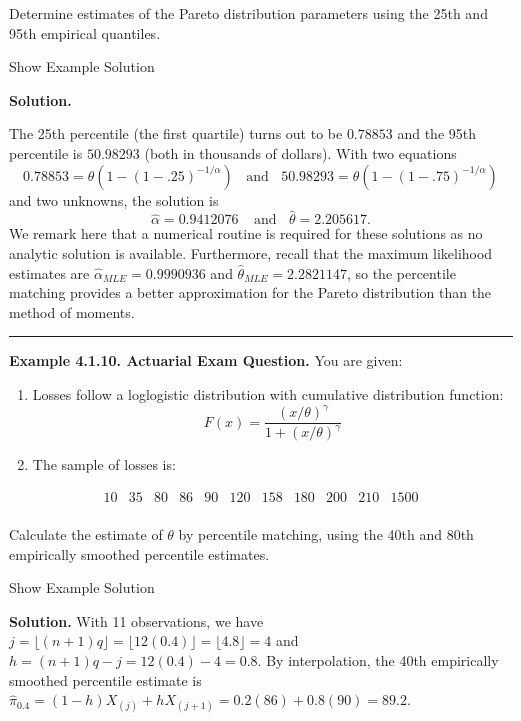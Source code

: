 \documentclass[]{book}
\providecommand{\tightlist}{%
  \setlength{\itemsep}{0pt}\setlength{\parskip}{0pt}}
\theoremstyle{definition}
\theoremstyle{definition}
\theoremstyle{definition}
\theoremstyle{remark}
\begin{document}
Determine estimates of the Pareto distribution parameters using the 25th
and 95th empirical quantiles.

Show Example Solution

\hypertarget{toggleExampleSelect.1.9}{}
\textbf{Solution.}

The 25th percentile (the first quartile) turns out to be \(0.78853\) and
the 95th percentile is \(50.98293\) (both in thousands of dollars). With
two equations
\[0.78853 = \theta \left( 1- (1-.25)^{-1/\alpha} \right) \ \ \ \ \text{and} \ \ \ \ 50.98293 = \theta \left( 1- (1-.75)^{-1/\alpha} \right)\]
and two unknowns, the solution is
\[\hat{\alpha} = 0.9412076 \ \ \ \ \ \text{and} \ \ \ \
\hat{\theta} = 2.205617 .\] We remark here that a numerical routine is
required for these solutions as no analytic solution is available.
Furthermore, recall that the maximum likelihood estimates are
\(\hat{\alpha}_{MLE} = 0.9990936\) and
\(\hat{\theta}_{MLE} = 2.2821147\), so the percentile matching provides
a better approximation for the Pareto distribution than the method of
moments.

\begin{center}\rule{0.5\linewidth}{\linethickness}\end{center}

\textbf{Example 4.1.10. Actuarial Exam Question.} You are given:

\begin{enumerate}
\def\labelenumi{(\roman{enumi})}
\tightlist
\item
  Losses follow a loglogistic distribution with cumulative distribution
  function:
  \[F(x) = \frac{\left(x/\theta\right)^{\gamma}}{1+\left(x/\theta\right)^{\gamma}}\]
\item
  The sample of losses is:
\end{enumerate}

\[\begin{array}{ccccccccccc}
10 &35 &80 &86 &90 &120 &158 &180 &200 &210 &1500 \\
\end{array}\]

Calculate the estimate of \(\theta\) by percentile matching, using the
40th and 80th empirically smoothed percentile estimates.

Show Example Solution

\hypertarget{toggleExampleSelect.1.10}{}
\textbf{Solution.} With 11 observations, we have
\(j=\lfloor(n+1)q\rfloor = \lfloor 12(0.4) \rfloor = \lfloor 4.8\rfloor=4\)
and \(h=(n+1)q-j = 12(0.4)-4=0.8\). By interpolation, the 40th
empirically smoothed percentile estimate is
\(\hat{\pi}_{0.4} = (1-h) X_{(j)} + h X_{(j+1)} = 0.2(86)+0.8(90)=89.2\).
\end{document}
